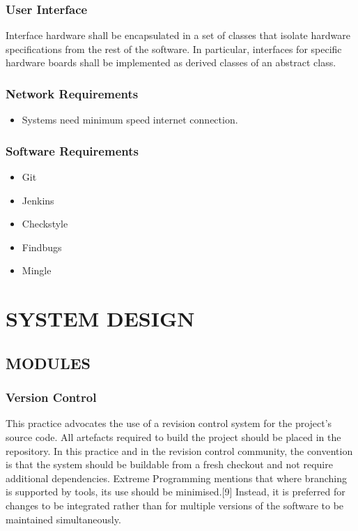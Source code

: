 \documentclass[12pt,a4paper,oneside]{report}
\begin{document}
{\subsection{User Interface}
Interface hardware shall be encapsulated in a set of classes that isolate hardware specifications from the rest of the software. In particular, interfaces for specific hardware boards shall be implemented as derived classes of an abstract class.
\\

\subsection{Network Requirements}  
\begin{itemize}
\item Systems need minimum speed internet connection.
\end{itemize}
\subsection{Software Requirements}
\begin{itemize}
\item Git
\item Jenkins
\item Checkstyle
\item Findbugs
\item Mingle
\end{itemize}
\chapter{SYSTEM DESIGN}
\section{MODULES}
\subsection{Version Control}

\par This practice advocates the use of a revision control system for the project's source code. All artefacts required to build the project should be placed in the repository. In this practice and in the revision control community, the convention is that the system should be buildable from a fresh checkout and not require additional dependencies.  Extreme Programming  mentions that where branching is supported by tools, its use should be minimised.[9] Instead, it is preferred for changes to be integrated rather than for multiple versions of the software to be maintained simultaneously. 
}
\end{document}
